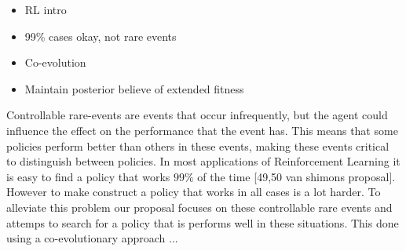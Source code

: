 
\begin{itemize}
  \item{RL intro}
  \item{99\% cases okay, not rare events}
  \item{Co-evolution}
  \item{Maintain posterior believe of extended fitness}
\end{itemize}

Controllable rare-events are events that occur infrequently, but the agent could influence the effect on the performance that the event has. This means that some policies perform better than others in these events, making these events critical to distinguish between policies. In most applications of Reinforcement Learning it is easy to find a policy that works $99\%$ of the time [49,50 van shimons proposal]. However to make construct a policy that works in all cases is a lot harder. To alleviate this problem our proposal focuses on these controllable rare events and attemps to search for a policy that is performs well in these situations. This done using a co-evolutionary approach ...